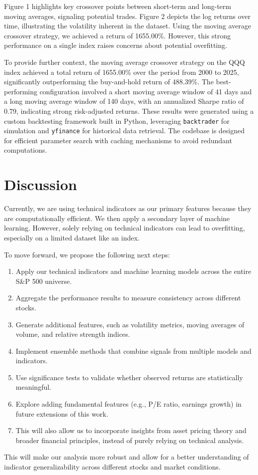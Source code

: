 \documentclass{article}
\begin{document}
Figure 1 highlights key crossover points between short-term and long-term moving averages, signaling potential trades. Figure 2 depicts the log returns over time, illustrating the volatility inherent in the dataset. Using the moving average crossover strategy, we achieved a return of 1655.00\%. However, this strong performance on a single index raises concerns about potential overfitting.

To provide further context, the moving average crossover strategy on the QQQ index achieved a total return of 1655.00\% over the period from 2000 to 2025, significantly outperforming the buy-and-hold return of 488.39\%. The best-performing configuration involved a short moving average window of 41 days and a long moving average window of 140 days, with an annualized Sharpe ratio of 0.79, indicating strong risk-adjusted returns. These results were generated using a custom backtesting framework built in Python, leveraging \texttt{backtrader} for simulation and \texttt{yfinance} for historical data retrieval. The codebase is designed for efficient parameter search with caching mechanisms to avoid redundant computations.




\section{Discussion}
Currently, we are using technical indicators as our primary features because they are computationally efficient. We then apply a secondary layer of machine learning. However, solely relying on technical indicators can lead to overfitting, especially on a limited dataset like an index.

To move forward, we propose the following next steps:
\begin{enumerate}
    \item Apply our technical indicators and machine learning models across the entire S\&P 500 universe.
    \item Aggregate the performance results to measure consistency across different stocks.
    \item Generate additional features, such as volatility metrics, moving averages of volume, and relative strength indices.
    \item Implement ensemble methods that combine signals from multiple models and indicators.
    \item Use significance tests to validate whether observed returns are statistically meaningful.
    \item Explore adding fundamental features (e.g., P/E ratio, earnings growth) in future extensions of this work.
    \item This will also allow us to incorporate insights from asset pricing theory and broader financial principles, instead of purely relying on technical analysis.
\end{enumerate}
This will make our analysis more robust and allow for a better understanding of indicator generalizability across different stocks and market conditions.
\end{document}
